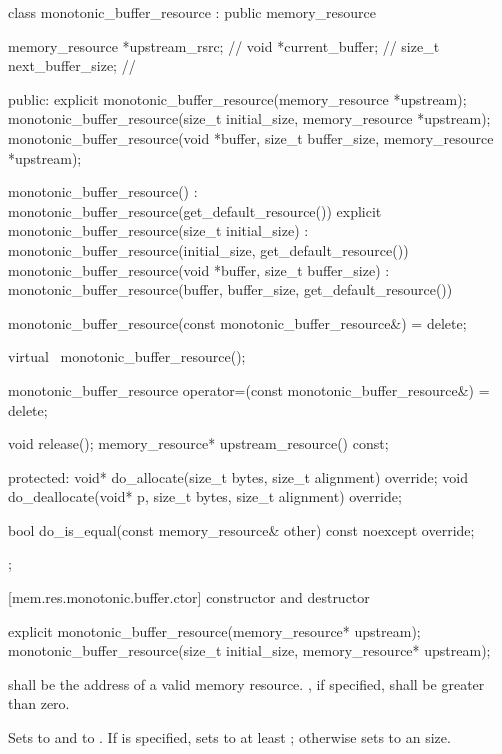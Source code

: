 %
\begin{codeblock}
class monotonic_buffer_resource : public memory_resource {
  memory_resource *upstream_rsrc; // \expos
  void *current_buffer;           // \expos
  size_t next_buffer_size;        // \expos

public:
  explicit monotonic_buffer_resource(memory_resource *upstream);
  monotonic_buffer_resource(size_t initial_size, memory_resource *upstream);
  monotonic_buffer_resource(void *buffer, size_t buffer_size,
                            memory_resource *upstream);

  monotonic_buffer_resource()
      : monotonic_buffer_resource(get_default_resource()) {}
  explicit monotonic_buffer_resource(size_t initial_size)
      : monotonic_buffer_resource(initial_size, get_default_resource()) {}
  monotonic_buffer_resource(void *buffer, size_t buffer_size)
      : monotonic_buffer_resource(buffer, buffer_size, get_default_resource()) {}

  monotonic_buffer_resource(const monotonic_buffer_resource&) = delete;

  virtual ~monotonic_buffer_resource();

  monotonic_buffer_resource
    operator=(const monotonic_buffer_resource&) = delete;

  void release();
  memory_resource* upstream_resource() const;

protected:
  void* do_allocate(size_t bytes, size_t alignment) override;
  void do_deallocate(void* p, size_t bytes, size_t alignment) override;

  bool do_is_equal(const memory_resource& other) const noexcept override;
};
\end{codeblock}

[mem.res.monotonic.buffer.ctor]{ constructor and destructor}

%
\begin{itemdecl}
explicit monotonic_buffer_resource(memory_resource* upstream);
monotonic_buffer_resource(size_t initial_size, memory_resource* upstream);
\end{itemdecl}

\begin{itemdescr}
\pnum
\requires
{} shall be the address of a valid memory resource.
, if specified, shall be greater than zero.

\pnum
\effects
Sets  to  and
 to .
If  is specified,
sets  to at least ;
otherwise sets  to an
 size.
\end{itemdescr}

